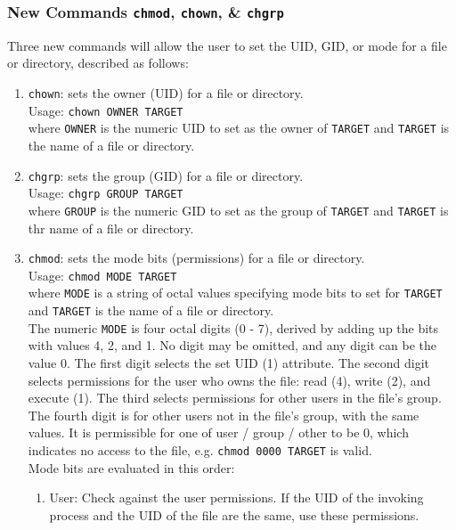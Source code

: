 \documentclass[11pt,letterpaper]{report}
\begin{document}
	\subsubsection{New Commands {\tt chmod}, {\tt chown},  \& {\tt chgrp}}
	Three new commands will allow the user to set the UID, GID, or mode for a file or directory, described as follows:
	\begin{enumerate}
		\item {\tt chown}: sets the owner (UID) for a file or directory.\\
		Usage: {\tt chown OWNER TARGET}\\
		where {\tt OWNER} is the numeric UID to set as the owner of {\tt TARGET} and {\tt TARGET} is the name of a file or directory.
		
		\item {\tt chgrp}: sets the group (GID)	for a file or directory.\\
		Usage: {\tt chgrp GROUP TARGET}\\
		where {\tt GROUP} is the numeric GID to set as the group of {\tt TARGET} and {\tt TARGET} is thr name of a file or directory.
		
		\item {\tt chmod}: sets the mode bits (permissions) for a file or directory.\\
		Usage: {\tt chmod MODE TARGET}\\
		where {\tt MODE} is a string of octal values specifying mode bits to set for {\tt TARGET} and {\tt TARGET} is the name of a file or directory.\\
		The numeric {\tt MODE} is four octal digits (0 - 7), derived by adding up the bits with values 4, 2, and 1. No digit may be omitted, and any digit can be the value 0. The first digit selects the set UID (1) attribute. The second digit selects permissions for the user who owns the file: read (4), write (2), and execute (1). The third selects permissions for other users in the file's group. The fourth digit is for other users not in the file's group, with the same values. It is permissible for one of user / group / other to be 0, which indicates no access to the file, e.g. {\tt chmod 0000 TARGET} is valid.\\
		Mode bits are evaluated in this order:
		\begin{enumerate}
			\item User: Check against the user permissions. If the UID of the invoking process and the UID of the file are the same, use these permissions.
			

\end{enumerate}
\end{enumerate}
\end{document}
